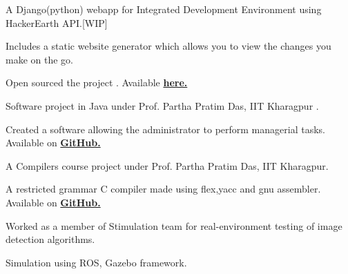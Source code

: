 \documentclass[a4paper]{deedy-resume} %
\begin{document}
\begin{minipage}[t]{0.66\textwidth}
  \sectionspace
  
  \runsubsection{}
  \begin{tightitemize}
  \item A Django(python) webapp for Integrated Development Environment using HackerEarth API.[WIP]
  \item Includes a static website generator which allows you to view the changes you make on the go.
  \item Open sourced the project . Available \href{https://github.com/kaustubhhiware/Code.Play}{\bf here.}
  \end{tightitemize}

  \sectionspace
  
  \runsubsection{}
  \begin{tightitemize}
  \item Software project in Java under Prof. Partha Pratim Das, IIT Kharagpur .
  \item Created a software allowing the administrator to perform managerial tasks. Available on \href{https://github.com/kaustubhhiware/DepInfosys}{\bf GitHub.}
  \end{tightitemize}

  \sectionspace

  \runsubsection{}
  \begin{tightitemize}
  \item A Compilers course project under Prof. Partha Pratim Das, IIT Kharagpur.
  \item A restricted grammar C compiler made using flex,yacc and gnu assembler. Available on \href{https://github.com/kaustubhhiware/cOMPILER}{\bf GitHub.}
  \end{tightitemize}
  
  \sectionspace

  \runsubsection{}
  \begin{tightitemize}
  \item	Worked as a member of Stimulation team for real-environment testing of image detection algorithms.
  \item Simulation using ROS, Gazebo framework.
 \end{tightitemize}



\end{minipage}
\end{document}
